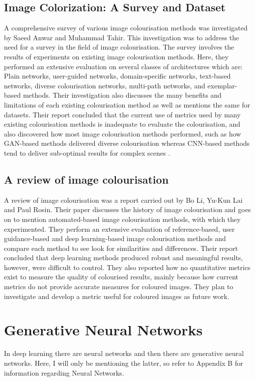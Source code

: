 \subsection{Image Colorization: A Survey and Dataset}
A comprehensive survey of various image colourisation methods was investigated by Saeed Anwar and Muhammad Tahir. This investigation was to address the need for a survey in the field of image colourisation. The survey involves the results of experiments on existing image colourisation methods. Here, they performed an extensive evaluation on several classes of architectures which are: Plain networks, user-guided networks, domain-specific networks, text-based networks, diverse colourisation networks, multi-path networks, and exemplar-based methods. Their investigation also discusses the many benefits and limitations of each existing colourisation method as well as mentions the same for datasets. Their report concluded that the current use of metrics used by many existing colourisation methods is inadequate to evaluate the colourisation, and also discovered how most image colourisation methods performed, such as how GAN-based methods delivered diverse colourisation whereas CNN-based methods tend to deliver sub-optimal results for complex scenes \cite{anwar2020ColorSurvey}. 

\subsection{A review of image colourisation}
A review of image colourisation was a report carried out by Bo Li, Yu-Kun Lai and Paul Rosin. Their paper discusses the history of image colourisation and goes on to mention automated-based image colourisation methods, with which they experimented. They perform an extensive evaluation of reference-based, user guidance-based and deep learning-based image colourisation methods and compare each method to see look for similarities and differences. Their report concluded that deep learning methods produced robust and meaningful results, however, were difficult to control. They also reported how no quantitative metrics exist to measure the quality of colourised results, mainly because how current metrics do not provide accurate measures for coloured images. They plan to investigate and develop a metric useful for coloured images as future work\cite{Li2019}.
\pagebreak
\section{Generative Neural Networks}
In deep learning there are neural networks and then there are generative neural networks. Here, I will only be mentioning the latter, so refer to Appendix B for information regarding Neural Networks.



